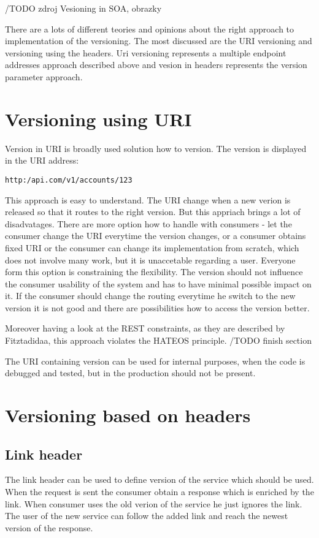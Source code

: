 /TODO zdroj Vesioning in SOA, obrazky

There are a lots of different teories and opinions about the right approach to implementation of the versioning. The most discussed are the URI versioning and versioning using the headers. Uri versioning represents a multiple endpoint addresses approach described above and vesion in headers represents the version parameter approach.

\section{Versioning using URI}
Version in URI is broadly used solution how to version. The version is displayed in the URI address:

\texttt{http:/api.com/v1/accounts/123}

This approach is easy to understand. The URI change when a new verion is released so that it routes to the right version. But this appriach brings a lot of disadvatages. There are more option how to handle with consumers - let the consumer change the URI everytime the version changes, or a consumer obtains fixed URI or the consumer can change its implementation from scratch, which does not involve many work, but it is unaccetable regarding a user.
Everyone form this option is constraining the flexibility.
The version should not influence the consumer usability of the system and has to have minimal possible impact on it. If the consumer should change the routing everytime he switch to the new version it is not good and there are possibilities how to access the version better.

Moreover having a look at the REST constraints, as they are described by Fitztadidaa, this approach violates the HATEOS principle. 
/TODO finish section 

The URI containing version can be used for internal purposes, when the code is debugged and tested, but in the production should not be present.

\section{Versioning based on headers}
\subsection{Link header}
The link header can be used to define version of the service which should be used. When the request is sent the consumer obtain a response which is enriched by the link. When consumer uses the old verion of the service he just ignores the link. The user of the new service can follow the added link and reach the newest version of the response.

